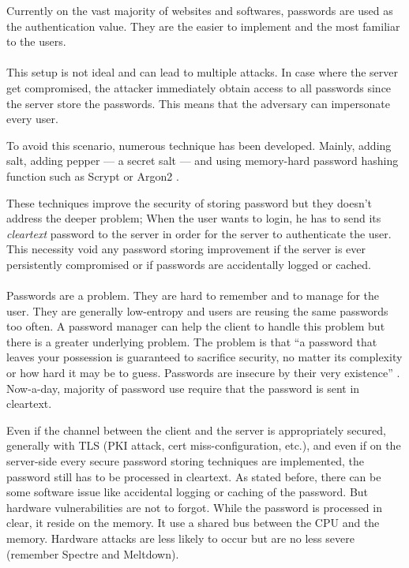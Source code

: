 \documentclass[../report.tex]{subfiles}
\begin{document}
Currently on the vast majority of websites and softwares, passwords are used as the authentication value. They are the easier to implement and the most familiar to the users.



\paragraph{}
This setup is not ideal and can lead to multiple attacks.
In case where the server get compromised, the attacker immediately obtain access to all passwords since the server store the passwords. This means that the adversary can impersonate every user.

To avoid this scenario, numerous technique has been developed.
Mainly, adding salt, adding pepper --- a secret salt --- and using memory-hard password hashing function such as Scrypt \cite{Scrypt_Paper} or Argon2 \cite{Argon2_Paper}.


These techniques improve the security of storing password but they doesn't address the deeper problem;
When the user wants to login, he has to send its \emph{cleartext} password to the server in order for the server to authenticate the user. This necessity void any password storing improvement if the server is ever persistently compromised or if passwords are accidentally logged or cached.


\paragraph{}
Passwords are a problem. They are hard to remember and to manage for the user. They are generally low-entropy and users are reusing the same passwords too often. A password manager can help the client to handle this problem but there is a greater underlying problem.
The problem is that ``a password that leaves your possession is guaranteed to sacrifice security, no matter its complexity or how hard it may be to guess. Passwords are insecure by their very existence'' \cite{PAKE_Cloudflare_blog}. %
Now-a-day, majority of password use require that the password is sent in cleartext.

Even if the channel between the client and the server is appropriately secured, generally with TLS (PKI attack, cert miss-configuration, etc.), %
and even if on the server-side every secure password storing techniques are implemented, the password still has to be processed in cleartext.
As stated before, there can be some software issue like accidental logging or caching of the password. But hardware vulnerabilities are not to forgot. While the password is processed in clear, it reside on the memory. It use a shared bus between the CPU and the memory. Hardware attacks are less likely to occur but are no less severe (remember Spectre and Meltdown). %
\end{document}

